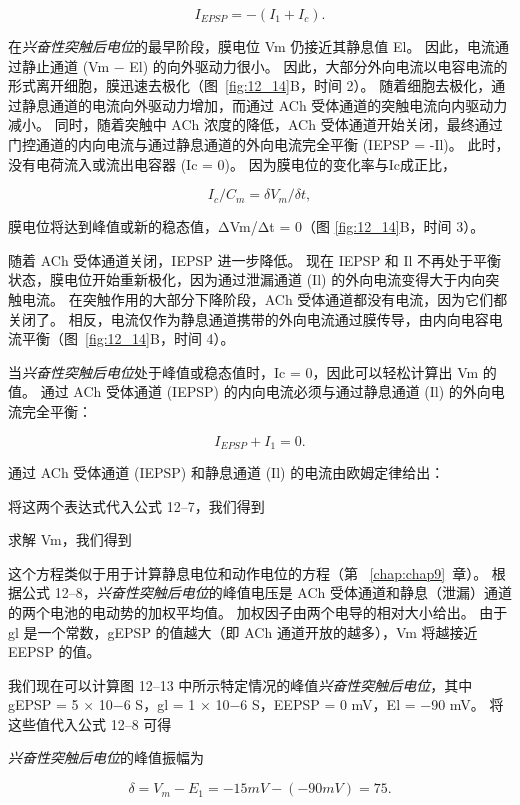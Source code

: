 \begin{equation}\label{ionic_current}
	I_{EPSP} = -(I_1 + I_c).
\end{equation}

在\textit{兴奋性突触后电位}的最早阶段，膜电位 Vm 仍接近其静息值 El。
因此，电流通过静止通道 (Vm − El) 的向外驱动力很小。
因此，大部分外向电流以电容电流的形式离开细胞，膜迅速去极化（图~\ref{fig:12_14}B，时间 2）。 
随着细胞去极化，通过静息通道的电流向外驱动力增加，而通过 ACh 受体通道的突触电流向内驱动力减小。
同时，随着突触中 ACh 浓度的降低，ACh 受体通道开始关闭，最终通过门控通道的内向电流与通过静息通道的外向电流完全平衡 (IEPSP = -Il)。
此时，没有电荷流入或流出电容器 (Ic = 0)。
因为膜电位的变化率与Ic成正比，


\begin{equation}\label{rate_potential}
	I_c / C_m = \delta V_m / \delta t,
\end{equation}

膜电位将达到峰值或新的稳态值，ΔVm/Δt = 0（图 \ref{fig:12_14}B，时间 3）。


随着 ACh 受体通道关闭，IEPSP 进一步降低。
现在 IEPSP 和 Il 不再处于平衡状态，膜电位开始重新极化，因为通过泄漏通道 (Il) 的外向电流变得大于内向突触电流。
在突触作用的大部分下降阶段，ACh 受体通道都没有电流，因为它们都关闭了。
相反，电流仅作为静息通道携带的外向电流通过膜传导，由内向电容电流平衡（图~\ref{fig:12_14}B，时间 4）。


当\textit{兴奋性突触后电位}处于峰值或稳态值时，Ic = 0，因此可以轻松计算出 Vm 的值。
通过 ACh 受体通道 (IEPSP) 的内向电流必须与通过静息通道 (Il) 的外向电流完全平衡：


\begin{equation}\label{outward_current}
	I_{EPSP} + I_1 = 0.
\end{equation}


通过 ACh 受体通道 (IEPSP) 和静息通道 (Il) 的电流由欧姆定律给出：

将这两个表达式代入公式 12–7，我们得到

求解 Vm，我们得到

这个方程类似于用于计算静息电位和动作电位的方程（第 ~\ref{chap:chap9}~章）。
根据公式 12–8，\textit{兴奋性突触后电位}的峰值电压是 ACh 受体通道和静息（泄漏）通道的两个电池的电动势的加权平均值。 
加权因子由两个电导的相对大小给出。
由于 gl 是一个常数，gEPSP 的值越大（即 ACh 通道开放的越多），Vm 将越接近 EEPSP 的值。


我们现在可以计算图 12–13 中所示特定情况的峰值\textit{兴奋性突触后电位}，其中 gEPSP = 5 × 10−6 S，gl = 1 × 10−6 S，EEPSP = 0 mV，El = −90 mV。
将这些值代入公式 12–8 可得


\textit{兴奋性突触后电位}的峰值振幅为

\begin{equation}\label{peak_amplitude}
	\delta = V_m - E_1 = -15mV - (-90mV) = 75.
\end{equation}


